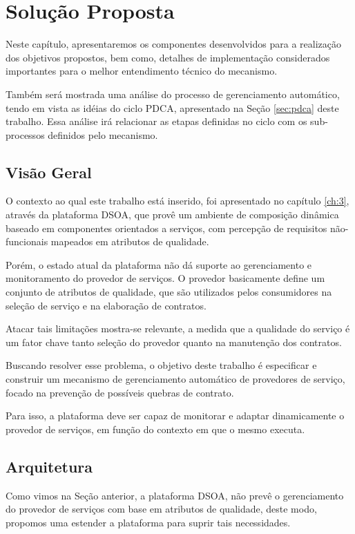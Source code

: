 \chapter{Solução Proposta}
\label{ch:4}

Neste capítulo, apresentaremos os componentes desenvolvidos para a realização dos objetivos propostos, bem como, detalhes de implementação considerados importantes para o melhor entendimento técnico do mecanismo. 

Também será mostrada uma análise do processo de gerenciamento automático, tendo em vista as idéias do ciclo PDCA, apresentado na Seção \ref{sec:pdca} deste trabalho. Essa análise irá relacionar as etapas definidas no ciclo com os sub-processos definidos pelo mecanismo.

\section{Visão Geral}
O contexto ao qual este trabalho está inserido, foi apresentado no capítulo \ref{ch:3}, através da plataforma DSOA, que provê um ambiente de composição dinâmica baseado em componentes orientados a serviços, com percepção de requisitos não-funcionais mapeados em atributos de qualidade. 

Porém, o estado atual da plataforma não dá suporte ao gerenciamento e monitoramento do provedor de serviços. O provedor basicamente define um conjunto de atributos de qualidade, que são utilizados pelos consumidores na seleção de serviço e na elaboração de contratos.

Atacar tais limitações mostra-se relevante, a medida que a qualidade do serviço é um fator chave tanto seleção do provedor quanto na manutenção dos contratos.

Buscando resolver esse problema, o objetivo deste trabalho é especificar e construir um mecanismo de gerenciamento automático de provedores de serviço, focado na prevenção de possíveis quebras de contrato. 

Para isso, a plataforma deve ser capaz de monitorar e adaptar dinamicamente o provedor de serviços, em função do contexto em que o mesmo executa.


\section{Arquitetura}
\label{sec:arch_prop}

Como vimos na Seção anterior, a plataforma DSOA, não prevê o gerenciamento do provedor de serviços com base em atributos de qualidade, deste modo, propomos uma estender a plataforma para suprir tais necessidades.

